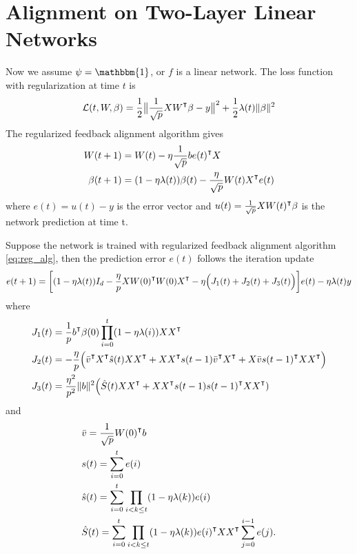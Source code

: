\section{Alignment on Two-Layer Linear Networks}\label{sec:appendix-alignment}

Now we assume $\psi = \mathbbm{1}$, or $f$ is a linear network. The loss function with regularization at time $t$ is 
\begin{equation}
\label{eq:reg_loss}
\Loss(t, W, \beta) = \frac{1}{2}\big\|\frac{1}{\sqrt p}XW\transpose\beta-y\big\|^2 + \frac{1}{2}\lambda(t)\|\beta\|^2
\end{equation}
The regularized feedback alignment algorithm gives
\begin{equation}
\label{eq:reg_alg}
\begin{aligned}
    W(t+1) &= W(t) - \eta\frac{1}{\sqrt p}b e(t)\transpose X\\
    \beta(t+1) &= (1-\eta\lambda(t))\beta(t)- \frac{\eta}{\sqrt p} W(t)X\transpose e(t)
\end{aligned}
\end{equation}
where $e(t)=u(t)-y$ is the error vector and $u(t) = \frac{1}{\sqrt p}XW(t)\transpose \beta$ is the network prediction at time t.


\begin{lemma}
\label{lma:one_step_update}
Suppose the network is trained with regularized feedback alignment algorithm \eqref{eq:reg_alg}, then the prediction error $e(t)$ follows the iteration update
\begin{equation}
\label{eq:err_update}
\begin{aligned}
    e(t+1) = \bigg[(1-\eta\lambda(t))I_d - \frac{\eta}{p}XW(0)\transpose W(0)X\transpose -\eta\Big(J_1(t)+J_2(t)+J_3(t)\Big)\bigg]e(t) -\eta\lambda(t)y
\end{aligned}
\end{equation}
where
\begin{equation*}
\begin{aligned}
&J_1(t) = \frac{1}{p}b\transpose\beta(0)\prod_{i=0}^{t}(1-\eta\lambda(i))XX\transpose \\
&J_2(t) = -\frac{\eta}{p}\Big(\bar{v}\transpose X\transpose \hat{s}(t) XX\transpose+ XX\transpose s(t-1)\bar{v}\transpose X\transpose + X \bar{v}s(t-1)\transpose XX\transpose\Big) \\
&J_3(t) = \frac{\eta^2}{p^2}\|b\|^2\Big(\hat{S}(t)XX\transpose + XX\transpose s(t-1)s(t-1)\transpose XX\transpose)
\end{aligned} 
\end{equation*}
and
\begin{equation*}
\begin{aligned}
&\bar{v} = \frac{1}{\sqrt p}W(0)\transpose b \\
&s(t) = \sum_{i=0}^{t}e(i) \\
&\hat{s}(t) = \sum_{i=0}^{t}\prod_{i<k\leq t}(1-\eta\lambda(k)) e(i) \\
&\hat{S}(t) = \sum_{i=0}^{t}\prod_{i<k\leq t}(1-\eta\lambda(k))e(i)\transpose XX\transpose \sum_{j=0}^{i-1}e(j).
\end{aligned}
\end{equation*}
\end{lemma}

